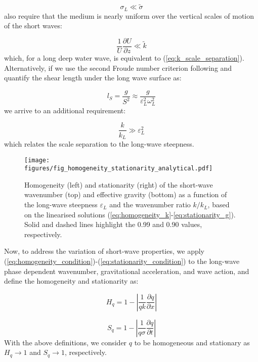 \documentclass[lineno]{jfm}
\begin{document}
\begin{equation}
  \sigma_L \ll \widetilde{\sigma}
\end{equation}
\citet{bretherton1968wavetrains} also require that the medium is nearly uniform
over the vertical scales of motion of the short waves:

\begin{equation}
  \frac{1}{U} \frac{\partial U}{\partial z} \ll \widetilde{k}
\end{equation}
which, for a long deep water wave, is equivalent to (\ref{eq:k_scale_separation}).
Alternatively, if we use the second Froude number criterion following
\citet{ellingsen2014ship} and quantify the shear length
under the long wave surface as:

\begin{equation}
  l_S = \frac{g}{S^2} \approx \frac{g}{\varepsilon_L^2 \omega_L^2}
\end{equation}
we arrive to an additional requirement:

\begin{equation}
  \frac{k}{k_L} \gg \varepsilon_L^2
\end{equation}
which relates the scale separation to the long-wave steepness.

\begin{figure}
\centering
\texttt{[image: figures/fig\_homogeneity\_stationarity\_analytical.pdf]}
\caption{
Homogeneity (left) and stationarity (right) of the short-wave wavenumber (top)
and effective gravity (bottom) as a function of the long-wave steepness
$\varepsilon_L$ and the wavenumber ratio $k/k_L$, based on the linearised
solutions (\ref{eq:homogeneity_k}-\ref{eq:stationarity_g}).
Solid and dashed lines highlight the 0.99 and 0.90 values, respectively.
}
\label{fig:homogeneity_stationarity_analytical}
\end{figure}

Now, to address the variation of short-wave properties,
we apply (\ref{eq:homogeneity_condition})-(\ref{eq:stationarity_condition}) to
the long-wave phase dependent wavenumber, gravitational acceleration, and
wave action, and define the homogeneity and stationarity as:

\begin{equation}
  H_q = 1 - \left| \frac{1}{qk} \frac{\partial q}{\partial x} \right|
\end{equation}

\begin{equation}
  S_q = 1 - \left| \frac{1}{q\sigma} \frac{\partial q}{\partial t} \right|
\end{equation}
With the above definitions, we consider $q$ to be homogeneous and stationary as
$H_q \rightarrow 1$ and $S_q \rightarrow 1$, respectively.
\end{document}
